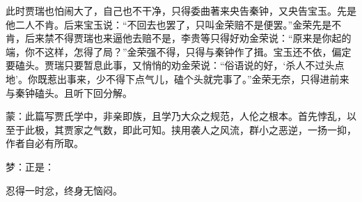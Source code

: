 \begin{parag}
    此时贾瑞也怕闹大了，自己也不干净，只得委曲著来央告秦钟，又央告宝玉。先是他二人不肯。后来宝玉说：“不回去也罢了，只叫金荣赔不是便罢。”金荣先是不肯，后来禁不得贾瑞也来逼他去赔不是，李贵等只得好劝金荣说：“原来是你起的端，你不这样，怎得了局？”金荣强不得，只得与秦钟作了揖。宝玉还不依，偏定要磕头。贾瑞只要暂息此事，又悄悄的劝金荣说：“俗语说的好，‘杀人不过头点地’。你既惹出事来，少不得下点气儿，磕个头就完事了。”金荣无奈，只得进前来与秦钟磕头。且听下回分解。
\end{parag}


\begin{parag}
    \begin{note}蒙：此篇写贾氏学中，非亲即族，且学乃大众之规范，人伦之根本。首先悖乱，以至于此极，其贾家之气数，即此可知。挟用袭人之风流，群小之恶逆，一扬一抑，作者自必有所取。\end{note}
\end{parag}


\begin{parag}
    \begin{note}梦：正是：\end{note}
\end{parag}


\begin{parag}
    \begin{note}忍得一时忿，终身无恼闷。\end{note}
\end{parag}


